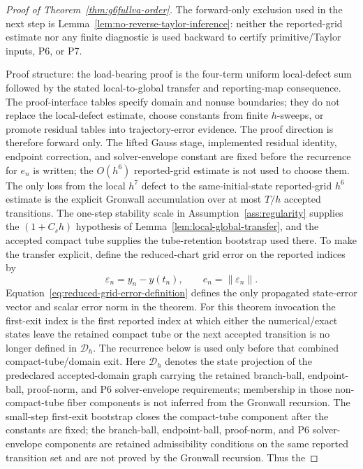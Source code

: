 \documentclass[preprint,12pt]{elsarticle}
\begin{document}
\begin{proof}[Proof of Theorem~\ref{thm:g6fullva-order}]
The forward-only exclusion used in the next step is
Lemma~\ref{lem:no-reverse-taylor-inference}: neither the reported-grid estimate nor any
finite diagnostic is used backward to certify primitive/Taylor inputs, P6, or
P7.

Proof structure: the load-bearing proof is the
four-term uniform local-defect sum followed by the stated local-to-global
transfer and reporting-map consequence. The proof-interface tables specify
domain and nonuse boundaries; they do not replace the local-defect estimate,
choose
constants from finite \(h\)-sweeps, or promote residual tables into
trajectory-error evidence.
The proof direction is therefore forward only.  The lifted Gauss stage,
implemented residual identity, endpoint correction, and solver-envelope constant
are fixed before the recurrence for \(e_n\) is written; the \(O(h^6)\)
reported-grid estimate is not used to choose them.  The only loss from the local \(h^7\)
defect to the same-initial-state reported-grid \(h^6\) estimate is the explicit Gronwall
accumulation over at most \(T/h\) accepted transitions.
The one-step stability scale in Assumption~\ref{ass:regularity} supplies the
\((1+C_s h)\) hypothesis of Lemma~\ref{lem:local-global-transfer}, and the
accepted compact tube supplies the tube-retention bootstrap used there.
To make the transfer explicit, define the reduced-chart grid error on the
reported indices by
\begin{equation}
\label{eq:reduced-grid-error-definition}
  \varepsilon_n=y_n-y(t_n),\qquad e_n=\|\varepsilon_n\| .
\end{equation}
Equation~\eqref{eq:reduced-grid-error-definition} defines the only propagated
state-error vector and scalar error norm in the theorem. For this theorem
invocation the first-exit index is the first reported index at which either
the numerical/exact states leave the retained compact tube or the next
accepted transition is no longer defined in \(\mathcal D_h\). The recurrence
below is used only before that combined compact-tube/domain exit. Here
\(\mathcal D_h\) denotes the state projection of the predeclared accepted-domain
graph carrying the retained branch-ball, endpoint-ball, proof-norm, and P6
solver-envelope requirements; membership in those non-compact-tube fiber
components is not inferred from the Gronwall recursion. The
small-step first-exit bootstrap closes the compact-tube component after the
constants are fixed; the branch-ball, endpoint-ball, proof-norm, and P6
solver-envelope components are retained admissibility conditions on the same
reported transition set and are not proved by the Gronwall recursion. Thus the

\end{proof}
\end{document}
